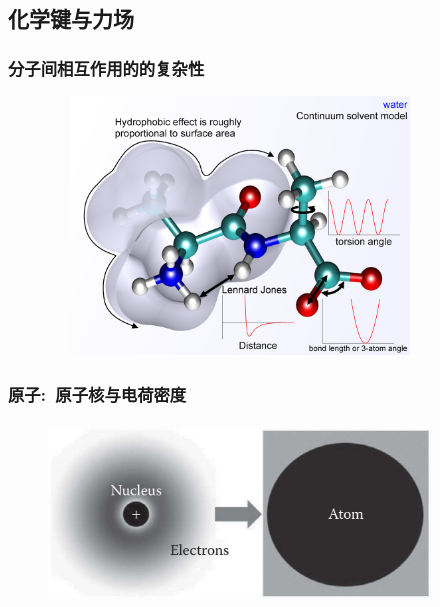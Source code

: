 \subsection{化学键与力场}
\frame
{
	\frametitle{分子间相互作用的的复杂性}
\begin{figure}[h!]
\centering
\label{MO-Bond_charge-density}
\vspace{-3.5pt}
\includegraphics[height=2.70in,width=4.00in,viewport=0 0 355 260,clip]{Figures/Molecular_mechanics-potential_energy_function-with-continuum_solvent.png}
\end{figure}
}

\frame
{
	\frametitle{原子:~原子核与电荷密度}
\begin{figure}[h!]
\centering
\vspace{3.5pt}
\includegraphics[height=1.90in,width=4.00in,viewport=0 0 1096 487,clip]{Figures/MD_atom_electron-nucleus.png}
\label{MO-Atom-Nuclear-electron}
\end{figure}
}


